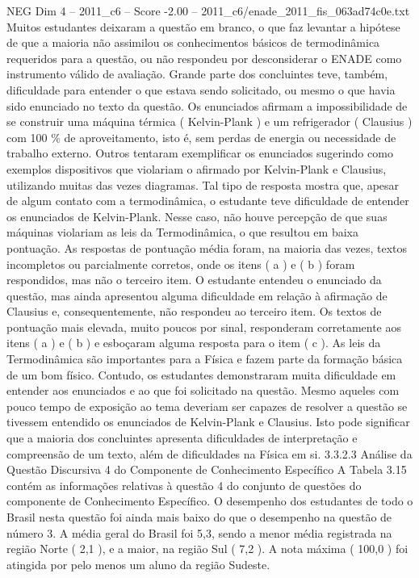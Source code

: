 \begin{textsample}{NEG Dim 4 – 2011\_c6 – Score -2.00 – 2011\_c6/enade\_2011\_fis\_063ad74c0e.txt}
Muitos estudantes deixaram a questão em branco, o que faz levantar a hipótese de que a maioria não assimilou os conhecimentos básicos de termodinâmica requeridos para a questão, ou não respondeu por desconsiderar o ENADE como instrumento válido de avaliação.
Grande parte dos concluintes teve, também, dificuldade para entender o que estava sendo solicitado, ou mesmo o que havia sido enunciado no texto da questão.
Os enunciados afirmam a impossibilidade de se construir uma máquina térmica ( Kelvin-Plank ) e um refrigerador ( Clausius ) com 100 \% de aproveitamento, isto é, sem perdas de energia ou necessidade de trabalho externo.
Outros tentaram exemplificar os enunciados sugerindo como exemplos dispositivos que violariam o afirmado por Kelvin-Plank e Clausius, utilizando muitas das vezes diagramas.
Tal tipo de resposta mostra que, apesar de algum contato com a termodinâmica, o estudante teve dificuldade de entender os enunciados de Kelvin-Plank.
Nesse caso, não houve percepção de que suas máquinas violariam as leis da Termodinâmica, o que resultou em baixa pontuação.
As respostas de pontuação média foram, na maioria das vezes, textos incompletos ou parcialmente corretos, onde os itens ( a ) e ( b ) foram respondidos, mas não o terceiro item.
O estudante entendeu o enunciado da questão, mas ainda apresentou alguma dificuldade em relação à afirmação de Clausius e, consequentemente, não respondeu ao terceiro item.
Os textos de pontuação mais elevada, muito poucos por sinal, responderam corretamente aos itens ( a ) e ( b ) e esboçaram alguma resposta para o item ( c ).
As leis da Termodinâmica são importantes para a Física e fazem parte da formação básica de um bom físico.
Contudo, os estudantes demonstraram muita dificuldade em entender aos enunciados e ao que foi solicitado na questão.
Mesmo aqueles com pouco tempo de exposição ao tema deveriam ser capazes de resolver a questão se tivessem entendido os enunciados de Kelvin-Plank e Clausius.
Isto pode significar que a maioria dos concluintes apresenta dificuldades de interpretação e compreensão de um texto, além de dificuldades na Física em si. 3.3.2.3 Análise da Questão Discursiva 4 do Componente de Conhecimento Específico A Tabela 3.15 contém as informações relativas à questão 4 do conjunto de questões do componente de Conhecimento Específico.
O desempenho dos estudantes de todo o Brasil nesta questão foi ainda mais baixo do que o desempenho na questão de número 3.
A média geral do Brasil foi 5,3, sendo a menor média registrada na região Norte ( 2,1 ), e a maior, na região Sul ( 7,2 ).
A nota máxima ( 100,0 ) foi atingida por pelo menos um aluno da região Sudeste.

\end{textsample}
